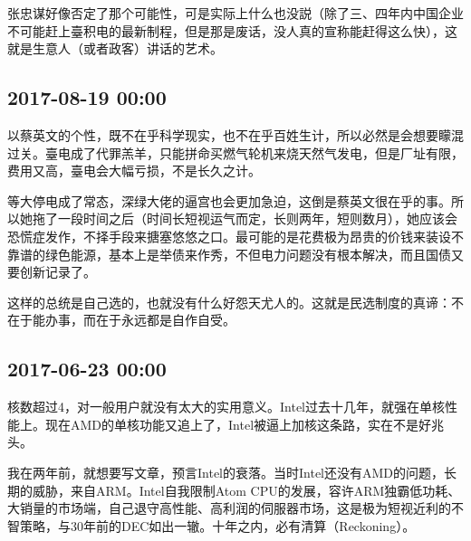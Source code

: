 \documentclass[twocolumn]{ctexart}
\begin{document}
张忠谋好像否定了那个可能性，可是实际上什么也没説（除了三、四年内中国企业不可能赶上臺积电的最新制程，但是那是废话，没人真的宣称能赶得这么快），这就是生意人（或者政客）讲话的艺术。\subsection*{2017-08-19 00:00}
以蔡英文的个性，既不在乎科学现实，也不在乎百姓生计，所以必然是会想要矇混过关。臺电成了代罪羔羊，只能拼命买燃气轮机来烧天然气发电，但是厂址有限，费用又高，臺电会大幅亏损，不是长久之计。

等大停电成了常态，深绿大佬的逼宫也会更加急迫，这倒是蔡英文很在乎的事。所以她拖了一段时间之后（时间长短视运气而定，长则两年，短则数月），她应该会恐慌症发作，不择手段来搪塞悠悠之口。最可能的是花费极为昂贵的价钱来装设不靠谱的绿色能源，基本上是举债来作秀，不但电力问题没有根本解决，而且国债又要创新记录了。

这样的总统是自己选的，也就没有什么好怨天尤人的。这就是民选制度的真谛：不在于能办事，而在于永远都是自作自受。\subsection*{2017-06-23 00:00}
核数超过4，对一般用户就没有太大的实用意义。Intel过去十几年，就强在单核性能上。现在AMD的单核功能又追上了，Intel被逼上加核这条路，实在不是好兆头。

我在两年前，就想要写文章，预言Intel的衰落。当时Intel还没有AMD的问题，长期的威胁，来自ARM。Intel自我限制Atom CPU的发展，容许ARM独霸低功耗、大销量的市场端，自己退守高性能、高利润的伺服器市场，这是极为短视近利的不智策略，与30年前的DEC如出一辙。十年之内，必有清算（Reckoning）。
\end{document}

